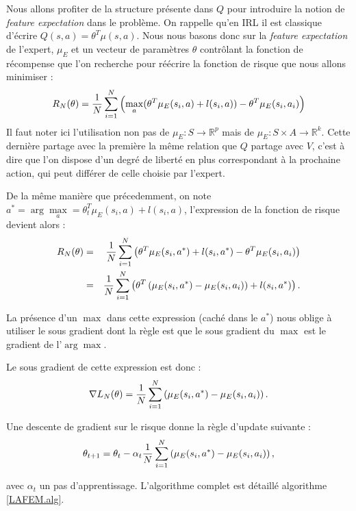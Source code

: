 \documentclass[publibook-draft]{CAp2012}
\begin{document}
   Nous allons profiter de la structure présente dans $Q$ pour introduire la notion de \emph{feature expectation} dans le problème. On rappelle qu'en IRL il est classique d'écrire $Q(s,a) = \theta^T \mu(s,a)$. Nous nous basons donc sur la \emph{feature expectation} de l'expert, $\mu_E$ et un vecteur de paramètres $\theta$ contrôlant la fonction de récompense que l'on recherche pour réécrire la fonction de risque que nous allons minimiser :
  \begin{equation}
   R_N(\theta) = {1\over N} \sum_{i=1}^N\left(\max_{a}(\theta ^T \mu_E(s_i,a) + l(s_i,a)) - \theta ^T \mu_E(s_i,a_i) \right)
   \end{equation}
   Il faut noter ici l'utilisation non pas de $\mu_E : S\rightarrow \mathbb{R}^p$ mais de $\mu_E : S\times A \rightarrow \mathbb{R}^k$. Cette dernière partage avec la première la même relation que $Q$ partage avec $V$, c'est à dire que l'on dispose d'un degré de liberté en plus correspondant à la prochaine action, qui peut différer de celle choisie par l'expert.

   
   De la même manière que précedemment, on note $a^* = \arg\max\limits_{a} = \theta_t ^T \mu_E(s_i,a) + l(s_i,a)$, l'expression de la fonction de risque devient alors :
   \begin{eqnarray}
   R_N(\theta) &=& {1\over N} \sum_{i=1}^N\left(\theta ^T \mu_E(s_i,a^*) + l(s_i,a^*) - \theta ^T \mu_E(s_i,a_i) \right)\\
   &=& {1\over N} \sum_{i=1}^N\left(\theta^T\left(\mu_E(s_i,a^*) - \mu_E(s_i,a_i)\right) + l(s_i,a^*)  \right).
   \end{eqnarray}

   La présence d'un $\max$ dans cette expression (caché dans le $a^*$) nous oblige à utiliser le sous gradient dont la règle est que le sous gradient du $\max$ est le gradient de l'$\arg\max$.

   Le sous gradient de cette expression est donc : 
   \begin{equation}
   \nabla L_N(\theta) =  {1\over N}\sum_{i=1}^N\left(\mu_E(s_i,a^*) - \mu_E(s_i,a_i)\right).
   \end{equation}

   Une descente de gradient sur le risque donne la règle d'update suivante :
   \begin{equation}
   \theta_{t+1} = \theta_t -\alpha_t{1\over N}\sum_{i=1}^N\left(\mu_E(s_i,a^*) - \mu_E(s_i,a_i)\right),
   \end{equation}

   avec $\alpha_t$ un pas d'apprentissage. L'algorithme complet est détaillé algorithme \ref{LAFEM.alg}.
\end{document}
